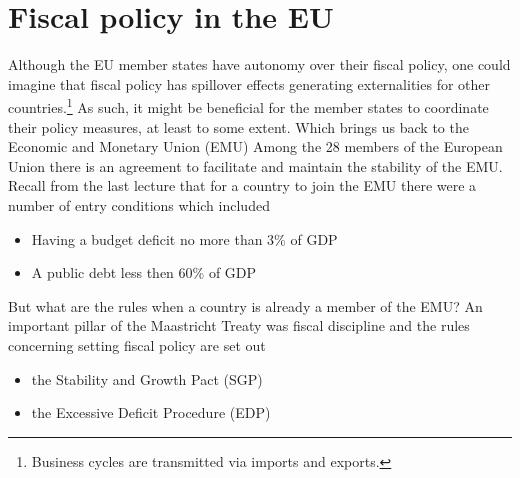 \documentclass{tufte-handout}
\begin{document}
\section{Fiscal policy in the EU}
Although the EU member states have autonomy over their fiscal policy, one could imagine that fiscal policy has spillover effects generating externalities for other countries.\footnote{Business cycles are transmitted via imports and exports.} 
As such, it might be beneficial for the member states to coordinate their policy measures, at least to some extent. 
Which brings us back to the Economic and Monetary Union (EMU)
Among the 28 members of the European Union there is an agreement to facilitate and maintain the stability of the EMU.
Recall from the last lecture that for a country to join the EMU there were a number of entry conditions which included
\begin{itemize}
  \item Having a budget deficit no more than 3\% of GDP
  \item A public debt less then 60\% of GDP
\end{itemize}
But what are the rules when a country is already a member of the EMU?
An important pillar of the Maastricht Treaty was fiscal discipline and the rules concerning setting fiscal policy are set out
\begin{itemize}
  \item the Stability and Growth Pact (SGP)
  \item the Excessive Deficit Procedure (EDP)
\end{itemize}

\end{document}
